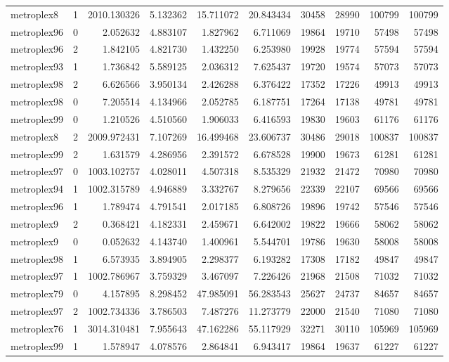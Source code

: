 \begin{longtable}{|l|r|r|r|r|r|r|r|r|r|}
metroplex8 & 1 & 2010.130326 & 5.132362 & 15.711072 & 20.843434 & 30458 & 28990 & 100799 & 100799 \\
metroplex96 & 0 & 2.052632 & 4.883107 & 1.827962 & 6.711069 & 19864 & 19710 & 57498 & 57498 \\
metroplex96 & 2 & 1.842105 & 4.821730 & 1.432250 & 6.253980 & 19928 & 19774 & 57594 & 57594 \\
metroplex93 & 1 & 1.736842 & 5.589125 & 2.036312 & 7.625437 & 19720 & 19574 & 57073 & 57073 \\
metroplex98 & 2 & 6.626566 & 3.950134 & 2.426288 & 6.376422 & 17352 & 17226 & 49913 & 49913 \\
metroplex98 & 0 & 7.205514 & 4.134966 & 2.052785 & 6.187751 & 17264 & 17138 & 49781 & 49781 \\
metroplex99 & 0 & 1.210526 & 4.510560 & 1.906033 & 6.416593 & 19830 & 19603 & 61176 & 61176 \\
metroplex8 & 2 & 2009.972431 & 7.107269 & 16.499468 & 23.606737 & 30486 & 29018 & 100837 & 100837 \\
metroplex99 & 2 & 1.631579 & 4.286956 & 2.391572 & 6.678528 & 19900 & 19673 & 61281 & 61281 \\
metroplex97 & 0 & 1003.102757 & 4.028011 & 4.507318 & 8.535329 & 21932 & 21472 & 70980 & 70980 \\
metroplex94 & 1 & 1002.315789 & 4.946889 & 3.332767 & 8.279656 & 22339 & 22107 & 69566 & 69566 \\
metroplex96 & 1 & 1.789474 & 4.791541 & 2.017185 & 6.808726 & 19896 & 19742 & 57546 & 57546 \\
metroplex9 & 2 & 0.368421 & 4.182331 & 2.459671 & 6.642002 & 19822 & 19666 & 58062 & 58062 \\
metroplex9 & 0 & 0.052632 & 4.143740 & 1.400961 & 5.544701 & 19786 & 19630 & 58008 & 58008 \\
metroplex98 & 1 & 6.573935 & 3.894905 & 2.298377 & 6.193282 & 17308 & 17182 & 49847 & 49847 \\
metroplex97 & 1 & 1002.786967 & 3.759329 & 3.467097 & 7.226426 & 21968 & 21508 & 71032 & 71032 \\
metroplex79 & 0 & 4.157895 & 8.298452 & 47.985091 & 56.283543 & 25627 & 24737 & 84657 & 84657 \\
metroplex97 & 2 & 1002.734336 & 3.786503 & 7.487276 & 11.273779 & 22000 & 21540 & 71080 & 71080 \\
metroplex76 & 1 & 3014.310481 & 7.955643 & 47.162286 & 55.117929 & 32271 & 30110 & 105969 & 105969 \\
metroplex99 & 1 & 1.578947 & 4.078576 & 2.864841 & 6.943417 & 19864 & 19637 & 61227 & 61227 \\

\end{longtable}

